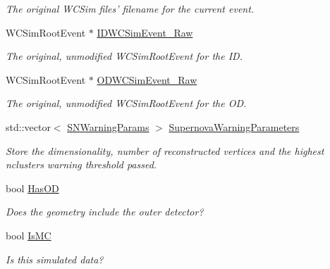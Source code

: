\begin{DoxyCompactItemize}
\begin{DoxyCompactList}\small\item\em The original W\-C\-Sim files' filename for the current event. \end{DoxyCompactList}\item 
\hypertarget{classDataModel_a56a200514179bea6b890f71defbc604d}{W\-C\-Sim\-Root\-Event $\ast$ \hyperlink{classDataModel_a56a200514179bea6b890f71defbc604d}{I\-D\-W\-C\-Sim\-Event\-\_\-\-Raw}}\label{classDataModel_a56a200514179bea6b890f71defbc604d}

\begin{DoxyCompactList}\small\item\em The original, unmodified {\ttfamily W\-C\-Sim\-Root\-Event} for the I\-D. \end{DoxyCompactList}\item 
\hypertarget{classDataModel_a661853dc2ab04c2ef681cd0174fabe5c}{W\-C\-Sim\-Root\-Event $\ast$ \hyperlink{classDataModel_a661853dc2ab04c2ef681cd0174fabe5c}{O\-D\-W\-C\-Sim\-Event\-\_\-\-Raw}}\label{classDataModel_a661853dc2ab04c2ef681cd0174fabe5c}

\begin{DoxyCompactList}\small\item\em The original, unmodified {\ttfamily W\-C\-Sim\-Root\-Event} for the O\-D. \end{DoxyCompactList}\item 
\hypertarget{classDataModel_ab7b2e24128b6b1f3346c4e78009f75c7}{std\-::vector$<$ \hyperlink{structSNWarningParams}{S\-N\-Warning\-Params} $>$ \hyperlink{classDataModel_ab7b2e24128b6b1f3346c4e78009f75c7}{Supernova\-Warning\-Parameters}}\label{classDataModel_ab7b2e24128b6b1f3346c4e78009f75c7}

\begin{DoxyCompactList}\small\item\em Store the dimensionality, number of reconstructed vertices and the highest nclusters warning threshold passed. \end{DoxyCompactList}\item 
\hypertarget{classDataModel_a414da75f26f3460f26285bd815f1e1b3}{bool \hyperlink{classDataModel_a414da75f26f3460f26285bd815f1e1b3}{Has\-O\-D}}\label{classDataModel_a414da75f26f3460f26285bd815f1e1b3}

\begin{DoxyCompactList}\small\item\em Does the geometry include the outer detector? \end{DoxyCompactList}\item 
\hypertarget{classDataModel_a172f201ebabd4bd2ec50673a31d242df}{bool \hyperlink{classDataModel_a172f201ebabd4bd2ec50673a31d242df}{Is\-M\-C}}\label{classDataModel_a172f201ebabd4bd2ec50673a31d242df}

\begin{DoxyCompactList}\small\item\em Is this simulated data? \end{DoxyCompactList}\end{DoxyCompactItemize}


